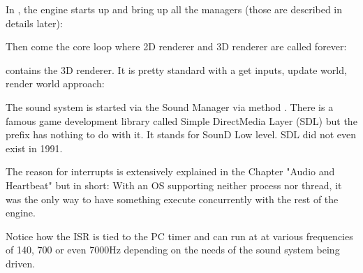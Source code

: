 \documentclass[book.tex]{subfiles}
\begin{document}
\par
In , the engine starts up and bring up all the managers (those are described in details later):\\
\par
\begin{minipage}{\textwidth}

\end{minipage}
\par
Then come the core loop where 2D renderer and 3D renderer are called forever:\\
\par
\begin{minipage}{\textwidth}

\end{minipage}
\par
{} contains the 3D renderer. It is pretty standard with a get inputs, update world, render world approach:\\
\par
\begin{minipage}{\textwidth}

\end{minipage}
\par
The sound system is started via the Sound Manager via method . There is a famous game development library called Simple DirectMedia Layer (SDL) but the prefix  has nothing to do with it. It stands for SounD Low level. SDL did not even exist in 1991.\\
\par
The reason for interrupts is extensively explained in the Chapter "Audio and Heartbeat" but in short: With an OS supporting neither process nor thread, it was the only way to have something execute concurrently with the rest of the engine.\\
\par
Notice how the ISR is tied to the PC timer and can run at at various frequencies of 140, 700 or even 7000Hz depending on the needs of the sound system being driven.\\
\par
\begin{minipage}{\textwidth}

\end{minipage}
\par
\end{document}
